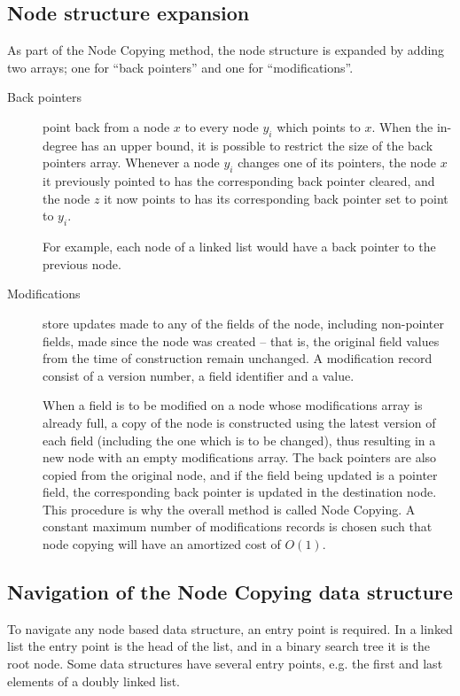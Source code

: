 \subsection{Node structure expansion}
As part of the Node Copying method, the node structure is expanded by adding two
arrays; one for ``back pointers'' and one for ``modifications''.

\begin{description}
  \item[Back pointers] 

  point back from a node $x$ to every node $y_i$ which points to $x$. When the
  in-degree has an upper bound, it is possible to restrict the size of the back
  pointers array. Whenever a node $y_i$ changes one of its pointers, the node
  $x$ it previously pointed to has the corresponding back pointer cleared, and
  the node $z$ it now points to has its corresponding back pointer set to point
  to $y_i$.
  
  For example, each node of a linked list would have a back pointer to the
  previous node.

  \item[Modifications] store updates made to any of the fields of the node,
  including non-pointer fields, made since the node was created -- that is, the
  original field values from the time of construction remain unchanged. A
  modification record consist of a version number, a field identifier and a
  value.
  
  When a field is to be modified on a node whose modifications array is already
  full, a copy of the node is constructed using the latest version of each field
  (including the one which is to be changed), thus resulting in a new node with
  an empty modifications array. The back pointers are also copied from the
  original node, and if the field being updated is a pointer field, the
  corresponding back pointer is updated in the destination node. This procedure
  is why the overall method is called Node Copying. A constant maximum number of
  modifications records is chosen such that node copying will have an amortized
  cost of $O(1)$.
\end{description}

\subsection{Navigation of the Node Copying data structure}
To navigate any node based data structure, an entry point is required. In a
linked list the entry point is the head of the list, and in a binary search tree
it is the root node. Some data structures have several entry points, e.g. the
first and last elements of a doubly linked list.

